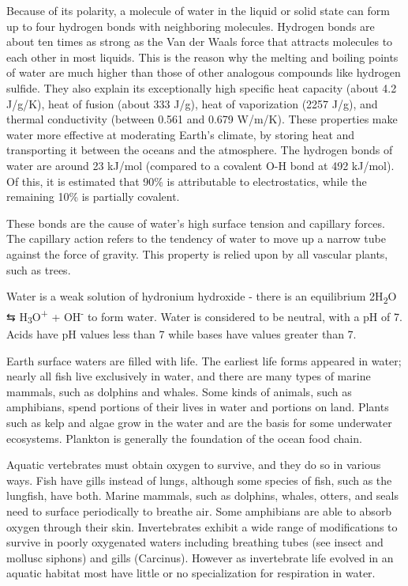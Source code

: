 Because of its polarity, a molecule of water in the liquid or solid state can form up to four hydrogen bonds with neighboring molecules. Hydrogen bonds are about ten times as strong as the Van der Waals force that attracts molecules to each other in most liquids. This is the reason why the melting and boiling points of water are much higher than those of other analogous compounds like hydrogen sulfide. They also explain its exceptionally high specific heat capacity (about 4.2 J/g/K), heat of fusion (about 333 J/g), heat of vaporization (2257 J/g), and thermal conductivity (between 0.561 and 0.679 W/m/K). These properties make water more effective at moderating Earth's climate, by storing heat and transporting it between the oceans and the atmosphere. The hydrogen bonds of water are around 23 kJ/mol (compared to a covalent O-H bond at 492 kJ/mol). Of this, it is estimated that 90\% is attributable to electrostatics, while the remaining 10\% is partially covalent.

These bonds are the cause of water's high surface tension and capillary forces. The capillary action refers to the tendency of water to move up a narrow tube against the force of gravity. This property is relied upon by all vascular plants, such as trees.

Water is a weak solution of hydronium hydroxide - there is an equilibrium 2H\textsubscript{2}O ⇆
H\textsubscript{3}O\textsuperscript{+} + OH\textsuperscript{-} to form water. Water is considered to be neutral, with a pH of 7. Acids have pH values less than 7 while bases have values greater than 7.

Earth surface waters are filled with life. The earliest life forms appeared in water; nearly all fish live exclusively in water, and there are many types of marine mammals, such as dolphins and whales. Some kinds of animals, such as amphibians, spend portions of their lives in water and portions on land. Plants such as kelp and algae grow in the water and are the basis for some underwater ecosystems. Plankton is generally the foundation of the ocean food chain.

Aquatic vertebrates must obtain oxygen to survive, and they do so in various ways. Fish have gills instead of lungs, although some species of fish, such as the lungfish, have both. Marine mammals, such as dolphins, whales, otters, and seals need to surface periodically to breathe air. Some amphibians are able to absorb oxygen through their skin. Invertebrates exhibit a wide range of modifications to survive in poorly oxygenated waters including breathing tubes (see insect and mollusc siphons) and gills (Carcinus). However as invertebrate life evolved in an aquatic habitat most have little or no specialization for respiration in water.

